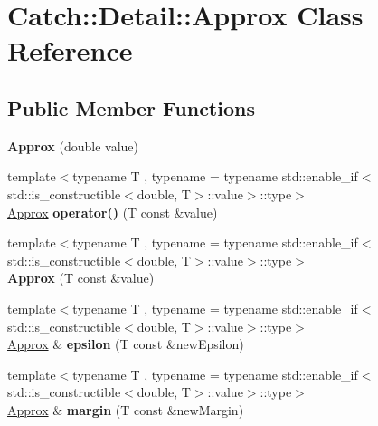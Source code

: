 \hypertarget{classCatch_1_1Detail_1_1Approx}{}\section{Catch\+:\+:Detail\+:\+:Approx Class Reference}
\label{classCatch_1_1Detail_1_1Approx}
\subsection*{Public Member Functions}
\begin{DoxyCompactItemize}
\item 
{\bfseries Approx} (double value)\hypertarget{classCatch_1_1Detail_1_1Approx_a1a8618ea8db08c66bd3d9fe8f74b957a}{}\label{classCatch_1_1Detail_1_1Approx_a1a8618ea8db08c66bd3d9fe8f74b957a}

\item 
{\footnotesize template$<$typename T , typename  = typename std\+::enable\+\_\+if$<$std\+::is\+\_\+constructible$<$double, T$>$\+::value$>$\+::type$>$ }\\\hyperlink{classCatch_1_1Detail_1_1Approx}{Approx} {\bfseries operator()} (T const \&value)\hypertarget{classCatch_1_1Detail_1_1Approx_ad8b2757f4804f9a1d3fa674efb98c20e}{}\label{classCatch_1_1Detail_1_1Approx_ad8b2757f4804f9a1d3fa674efb98c20e}

\item 
{\footnotesize template$<$typename T , typename  = typename std\+::enable\+\_\+if$<$std\+::is\+\_\+constructible$<$double, T$>$\+::value$>$\+::type$>$ }\\{\bfseries Approx} (T const \&value)\hypertarget{classCatch_1_1Detail_1_1Approx_ab14b979fa8a37f21d037157fabed4072}{}\label{classCatch_1_1Detail_1_1Approx_ab14b979fa8a37f21d037157fabed4072}

\item 
{\footnotesize template$<$typename T , typename  = typename std\+::enable\+\_\+if$<$std\+::is\+\_\+constructible$<$double, T$>$\+::value$>$\+::type$>$ }\\\hyperlink{classCatch_1_1Detail_1_1Approx}{Approx} \& {\bfseries epsilon} (T const \&new\+Epsilon)\hypertarget{classCatch_1_1Detail_1_1Approx_acd26adba86a066b9f40dad467f23bc85}{}\label{classCatch_1_1Detail_1_1Approx_acd26adba86a066b9f40dad467f23bc85}

\item 
{\footnotesize template$<$typename T , typename  = typename std\+::enable\+\_\+if$<$std\+::is\+\_\+constructible$<$double, T$>$\+::value$>$\+::type$>$ }\\\hyperlink{classCatch_1_1Detail_1_1Approx}{Approx} \& {\bfseries margin} (T const \&new\+Margin)\hypertarget{classCatch_1_1Detail_1_1Approx_a6467dc18791e1a1f4c15c4fb63cf5051}{}\label{classCatch_1_1Detail_1_1Approx_a6467dc18791e1a1f4c15c4fb63cf5051}


\end{DoxyCompactItemize}
